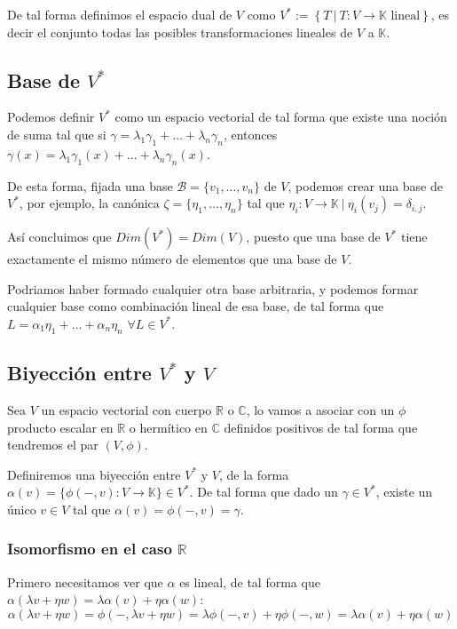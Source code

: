 \documentclass{preset}
\begin{document}
\noindent De tal forma definimos el espacio dual de $V$ como $V^* := \left\{T \: \vert \: T: V \rightarrow \mathbb{K} \mbox{ lineal} \right\}$, es decir el conjunto todas las posibles transformaciones lineales de $V$ a $\mathbb{K}$.

\vspace{-15pt}
\subsection{Base de $V^*$}

Podemos definir $V^*$ como un espacio vectorial de tal forma que existe una noción de suma tal que si $\gamma=\lambda_1\gamma_1+\dots+\lambda_n\gamma_n$, entonces $\gamma(x)=\lambda_1\gamma_1(x)+\dots+\lambda_n\gamma_n(x)$.

De esta forma, fijada una base $\mathcal{B}=\{v_1,\dots,v_n\}$ de $V$, podemos crear una base de $V^*$, por ejemplo, la canónica $\zeta=\{\eta_1,\dots,\eta_n\}$ tal que $\eta_i: V \rightarrow \mathbb{K} \: \vert \: \eta_i(v_j)=\delta_{i,j}$.

Así concluimos que $Dim(V^*)=Dim(V)$, puesto que una base de $V^*$ tiene exactamente el mismo número de elementos que una base de $V$.

Podriamos haber formado cualquier otra base arbitraria, y podemos formar cualquier base como combinación lineal de esa base, de tal forma que $L=\alpha_1\eta_1+\dots+\alpha_n\eta_n$ $\forall L \in V^{*}$.

\vspace{-15pt}
\subsection{Biyección entre $V^*$ y $V$}
Sea $V$ un espacio vectorial con cuerpo $\mathbb{R}$ o $\mathbb{C}$, lo vamos a asociar con un $\phi$ producto escalar en $\mathbb{R}$ o hermítico en $\mathbb{C}$ definidos positivos de tal forma que tendremos el par $(V,\phi)$.

Definiremos una biyección entre $V^*$ y $V$, de la forma $\alpha(v)=\{\phi(-,v): V \rightarrow \mathbb{K}\} \in V^*$. De tal forma que dado un $\gamma \in V^*$, existe un único $v \in V$ tal que $\alpha(v)=\phi(-,v)=\gamma$.

\vspace{-15pt}
\subsubsection{Isomorfismo en el caso $\mathbb{R}$}
\vspace{-5pt}
Primero necesitamos ver que $\alpha$ es lineal, de tal forma que $\alpha(\lambda v + \eta w)= \lambda \alpha(v) + \eta \alpha(w)$:
\vspace{-10pt}
\[\alpha(\lambda v + \eta w) = \phi(-,\lambda v + \eta w)=\lambda \phi(-,v)+\eta \phi(-,w)=\lambda \alpha(v) + \eta \alpha(w)\]
\end{document}
